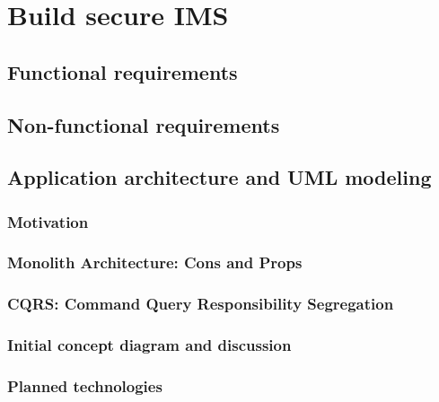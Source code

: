 
\chapter{Build secure IMS}\label{ch:build-secure-ims}


\section{Functional requirements}\label{sec:functional-requirements}


\section{Non-functional requirements}\label{sec:non-functional-requirements}


\section{Application architecture and UML modeling}\label{sec:application-architecture-and-uml-modeling}

\subsection{Motivation}\label{subsec:general-assumptions}

\subsection{Monolith Architecture: Cons and Props}\label{subsec:monolith-architecture:-cons-and-props}

\subsection{CQRS: Command Query Responsibility Segregation}\label{subsec:cqrs:-command-query-responsibility-segregation}

\subsection{Initial concept diagram and discussion}\label{subsec:initial-concept-diagram}

\subsection{Planned technologies}\label{subsec:planned-technologies}